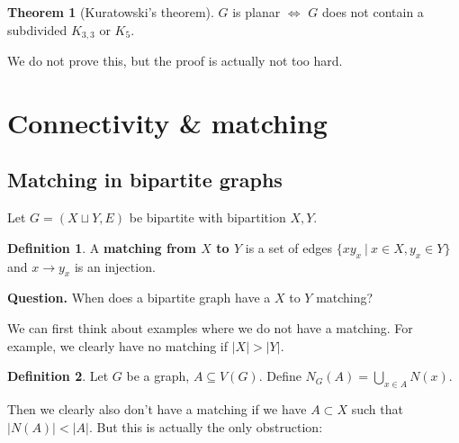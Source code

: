\documentclass{article}
\theoremstyle{definition}
\newtheorem{theorem}{Theorem}[section]
\newtheorem{defn}{Definition}[section]
\begin{document}
\begin{theorem}[Kuratowski's theorem]
    $G$ is planar $\iff$ $G$ does not contain a subdivided $K_{3,3}$ or $K_5$. 
\end{theorem}

We do not prove this, but the proof is actually not too hard.

\newpage
\section{Connectivity \& matching}

\subsection{Matching in bipartite graphs}

Let $G = (X \sqcup Y, E)$ be bipartite with bipartition $X,Y$.
\begin{defn}
    A \textbf{matching from $X$ to $Y$} is a set of edges $\{xy_x ~|~ x \in X, y_x \in Y\}$ and $x \to y_x$ is an injection. 
\end{defn}

\textbf{Question.} When does a bipartite graph have a $X$ to $Y$ matching?

We can first think about examples where we do not have a matching. For example, we clearly have no matching if $|X| > |Y|$. 
\begin{defn}
    Let $G$ be a graph, $A \subseteq V(G)$. Define $N_G(A) = \bigcup_{x \in A} N(x)$.
\end{defn}
Then we clearly also don't have a matching if we have $A \subset X$ such that $|N(A)| < |A|$. But this is actually the only obstruction:
\end{document}
